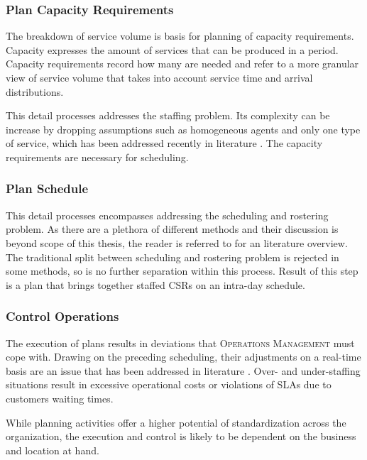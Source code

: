 	\subsubsection{Plan Capacity Requirements}
	The breakdown of service volume is basis for planning of capacity requirements. Capacity expresses the amount of services that can be produced in a period. Capacity requirements record how many  are needed and refer to a more granular view of service volume that takes into account service time and arrival distributions. 
	
	This detail processes addresses the staffing problem. Its complexity can be increase by dropping assumptions such as homogeneous agents and only one type of service, which has been addressed recently in literature \citep[]{Aksin_2009}. The capacity requirements are necessary for scheduling.
	
	\subsubsection{Plan Schedule}
	This detail processes encompasses addressing the scheduling and rostering problem. As there are a plethora of different methods and their discussion is beyond scope of this thesis, the reader is referred to  \citep[]{Aksin_2009} for an literature overview. The traditional split between scheduling and rostering problem is rejected in some methods, so is no further separation within this process. Result of this step is a plan that brings together staffed \acrshort{CSR}s on an intra-day schedule.
	
	\subsubsection{Control Operations}
	The execution of plans results in deviations that \textsc{Operations Management} must cope with. Drawing on the preceding scheduling, their adjustments on a real-time basis are an issue that has been addressed in literature \citep{Hur_2009, Easton_2005, Mehrotra_2009}. Over- and under-staffing situations result in excessive operational costs or violations of \acrshort{SLA}s due to customers waiting times. 
	
	While planning activities offer a higher potential of standardization across the organization, the execution and control is likely to be dependent on the business and location at hand. 
	
